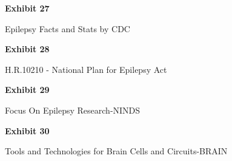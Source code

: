 \documentclass{article}
\begin{document}





\vspace*{\fill}
\begin{center}
{\LARGE \bf
Exhibit 27
}

\vspace{10\baselineskip}

{\large Epilepsy Facts and Stats by CDC }

\end{center}
\vspace*{\fill}






\vspace*{\fill}
\begin{center}

{\LARGE \bf
Exhibit 28
}

\vspace{10\baselineskip}

{\large H.R.10210 - National Plan for Epilepsy Act}

\end{center}
\vspace*{\fill}






\vspace*{\fill}
\begin{center}

{\LARGE \bf
Exhibit 29
}

\vspace{10\baselineskip}

{\large Focus On Epilepsy Research-NINDS}

\end{center}
\vspace*{\fill}






\vspace*{\fill}
\begin{center}

{\LARGE \bf
Exhibit 30
}

\vspace{10\baselineskip}

{\large Tools and Technologies for Brain Cells and Circuits-BRAIN}

\end{center}
\vspace*{\fill}
\end{document}

